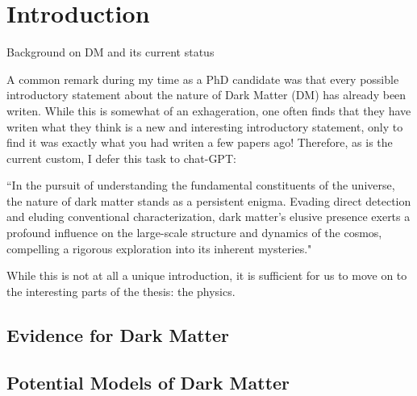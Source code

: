 \graphicspath{{img/chapter_1/}}

\chapter{Introduction}
\label{chapter:introduction}

\begin{synopsis}
    Background on DM and its current status
  \end{synopsis}

  A common remark during my time as a PhD candidate was that every 
  possible introductory statement about the nature of Dark Matter 
  (DM) has already been writen. While this is somewhat of an exhageration, 
  one often finds that they have writen what they think is a new and 
  interesting introductory statement, only to find it was exactly what
  you had writen a few papers ago! Therefore, as is the current custom, 
  I defer this task to chat-GPT:

  \begin{displayquote}
  ``In the pursuit of understanding the fundamental constituents 
    of the universe, the nature of dark matter stands as a persistent 
    enigma. Evading direct detection and eluding conventional 
    characterization, dark matter's elusive presence exerts a profound 
    influence on the large-scale structure and dynamics of the cosmos, 
    compelling a rigorous exploration into its inherent mysteries."
  \end{displayquote}
  While this is not at all a unique introduction, it is
  sufficient for us to move on to the interesting parts of the thesis:
  the physics. 

  \section{Evidence for Dark Matter}

  \section{Potential Models of Dark Matter}

